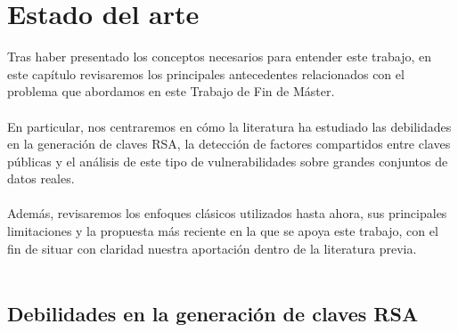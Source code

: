 \chapter{Estado del arte}

Tras haber presentado los conceptos necesarios para entender este trabajo, en este capítulo revisaremos los principales antecedentes relacionados con el problema que abordamos en este Trabajo de Fin de Máster.
\\
\\
En particular, nos centraremos en cómo la literatura ha estudiado las debilidades en la generación de claves RSA, la detección de factores compartidos entre claves públicas y el análisis de este tipo de vulnerabilidades sobre grandes conjuntos de datos reales.
\\
\\
Además, revisaremos los enfoques clásicos utilizados hasta ahora, sus principales limitaciones y la propuesta más reciente en la que se apoya este trabajo, con el fin de situar con claridad nuestra aportación dentro de la literatura previa.
\\
\\

\section{Debilidades en la generación de claves RSA}


